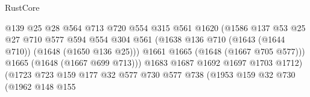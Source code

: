 \begin{lexlean}{RustCore}
\begin{coremodule}
                                          @139
                                          @25
                                          @28
                                          @564
                                          @713
                                          @720
                                          @554
                                          @315
                                          @561
                                          @1620
                                          (@1586
                                            @137
                                            @53
                                            @25
                                            @27
                                            @710
                                            @577
                                            @594
                                            @554
                                            @304
                                            @561
                                            (@1638
                                              @136
                                              @710
                                              (@1643 (@1644 @710))
                                              (@1648 (@1650 @136 @25)))
                                            @1661
                                            @1665
                                            (@1648 (@1667 @705 @577)))
                                          @1665
                                          (@1648 (@1667 @699 @713)))
                                        @1683
                                        @1687
                                        @1692
                                        @1697
                                        @1703
                                        @1712)
                                      (@1723
                                        @723
                                        @159
                                        @177
                                        @32
                                        @577
                                        @730
                                        @577
                                        @738
                                        (@1953
                                          @159
                                          @32
                                          @730
                                          (@1962
                                            @148
                                            @155

\end{coremodule}
\end{lexlean}
